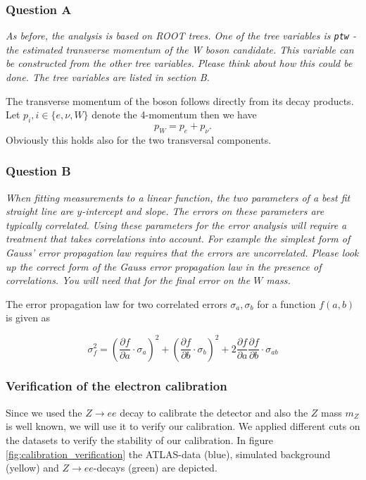 \documentclass[11pt,a4paper,notitlepage]{scrartcl}
\begin{document}
\subsubsection*{Question A}
\emph{As before, the analysis is based on ROOT trees. One of the tree variables is \texttt{ptw} - the estimated transverse momentum of the W boson candidate. This variable can be constructed from the other tree variables. Please think about how this could be done. The tree variables are listed in section B.}

The transverse momentum of the boson follows directly from its decay products. Let $p_{i}, i\in \{e,\nu,W\}$ denote the 4-momentum then we have $$p_W=p_e+p_\nu.$$ Obviously this holds also for the two transversal components.
\subsubsection*{Question B}
\emph{When fitting measurements to a linear function, the two parameters of a best fit straight line are $y$-intercept and slope. The errors on these parameters are typically correlated. Using these parameters for the error analysis will require a treatment that takes correlations into account. For example the simplest form of Gauss’ error propagation law requires that the errors are uncorrelated. Please look up the correct form of the Gauss error propagation law in the presence of correlations. You will need that for the final error on the $W$ mass.}

The error propagation law for two correlated errors $\sigma_a,\sigma_b$ for a function $f(a,b)$ is given as \cite{errors}

\begin{equation}
\sigma_f^2=\left(\frac{\partial f}{\partial a}\cdot \sigma_a\right)^2+\left(\frac{\partial f}{\partial b}\cdot \sigma_b\right)^2+2\frac{\partial f}{\partial a}\frac{\partial f}{\partial b}\cdot\sigma_{ab}
\label{eq:err}
\end{equation}


\subsubsection{Verification of the electron calibration}
Since we used the $Z\to ee$ decay to calibrate the detector and also the $Z$ mass $m_Z$ is well known, we will use it to verify our calibration. We applied different cuts on the datasets to verify the stability of our calibration. In figure \ref{fig:calibration_verification} the ATLAS-data (blue), simulated background (yellow) and $Z\to ee$-decays (green) are depicted. 
\end{document}
